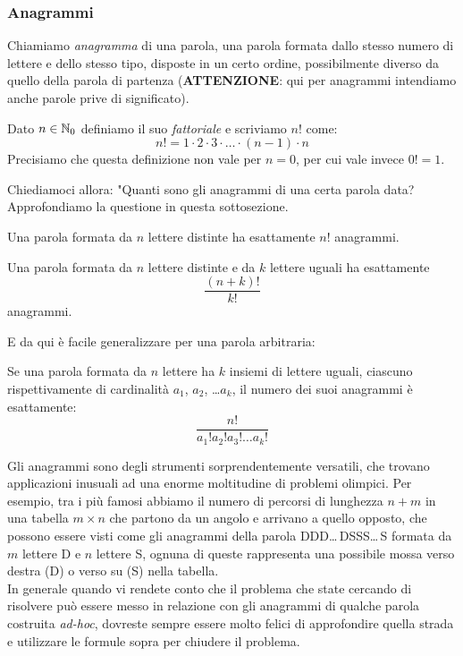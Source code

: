 \documentclass[11pt]{scrartcl}
\begin{document}
	\subsubsection{Anagrammi}
	\begin{definition}
		Chiamiamo \textit{anagramma} di una parola, una parola formata dallo stesso numero di lettere e dello stesso tipo, disposte in un certo ordine, possibilmente diverso da quello della parola di partenza (\textbf{ATTENZIONE}: qui per anagrammi intendiamo anche parole prive di significato).
	\end{definition}
	\begin{definition}
		\label{factorial}
		Dato $n\in\mathbb N_0$ definiamo il suo \textit{fattoriale} e scriviamo $n!$ come:
		$$n!=1\cdot2\cdot3\cdot\dots\cdot(n-1)\cdot n$$
		Precisiamo che questa definizione non vale per $n=0$, per cui vale invece $0!=1$.
	\end{definition}
	Chiediamoci allora: "Quanti sono gli anagrammi di una certa parola data?\\
	Approfondiamo la questione in questa sottosezione.
	
	\begin{theorem}
		\label{anag:1}
		Una parola formata da $n$ lettere distinte ha esattamente $n!$ anagrammi.
	\end{theorem}
	\begin{theorem}
		\label{anag:2}
		Una parola formata da $n$ lettere distinte e da $k$ lettere uguali ha esattamente
		$$\frac{(n+k)!}{k!}$$
		anagrammi.
	\end{theorem}
	E da qui è facile generalizzare per una parola arbitraria:
	\begin{theorem}
		\label{anag:3}
		Se una parola formata da $n$ lettere ha $k$ insiemi di lettere uguali, ciascuno rispettivamente di cardinalità $a_1$, $a_2$, \dots $a_k$, il numero dei suoi anagrammi è esattamente:
		$$\frac{n!}{a_1!a_2!a_3!\dots a_k!}$$
	\end{theorem}
	Gli anagrammi sono degli strumenti sorprendentemente versatili, che trovano applicazioni inusuali ad una enorme moltitudine di problemi olimpici. Per esempio, tra i più famosi abbiamo il numero di percorsi di lunghezza $n+m$ in una tabella $m\times n$ che partono da un angolo e arrivano a quello opposto, che possono essere visti come gli anagrammi della parola DDD\dots\,DSSS\dots\,S formata da $m$ lettere D e $n$ lettere S, ognuna di queste rappresenta una possibile mossa verso destra (D) o verso su (S) nella tabella. 
	\\
	In generale quando vi rendete conto che il problema che state cercando di risolvere può essere messo in relazione con gli anagrammi di qualche parola costruita \textit{ad-hoc}, dovreste sempre essere molto felici di approfondire quella strada e utilizzare le formule sopra per chiudere il problema.
	
\end{document}
